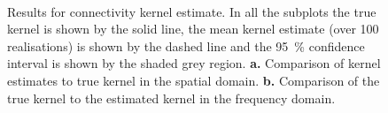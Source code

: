 \documentclass[10pt,a4paper]{article}
\begin{document}
\begin{figure}
    \centering
{}
\\
\caption{Results for connectivity kernel estimate. In all the subplots the true kernel is shown by the solid line, the mean kernel estimate (over 100 realisations) is shown by the dashed line and the 95~\% confidence interval is shown by the shaded grey region. \textbf{a.} Comparison of kernel estimates to true kernel in the spatial domain. \textbf{b.} Comparison of the true kernel to the estimated kernel in the frequency domain.}
\label{fig:KernelEstimates}
\end{figure}
\end{document}

